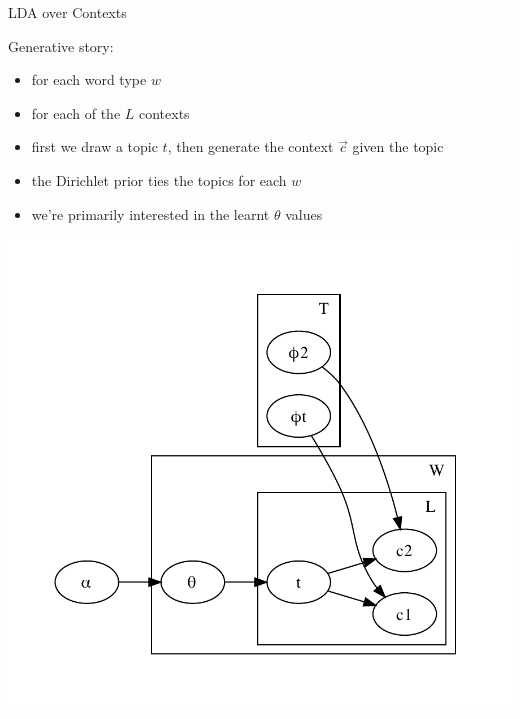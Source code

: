 \documentclass{beamer}
\begin{document}
\begin{frame}[t]{LDA over Contexts}

Generative story:
\begin{itemize}
    \item for each word type $w$
    \item for each of the $L$ contexts
    \item first we draw a topic $t$, then generate the context $\vec{c}$ given the topic
    \item the Dirichlet prior ties the topics for each $w$
    \item we're primarily interested in the learnt $\theta$ values
\end{itemize}

\includegraphics[scale=0.4]{context_lda.pdf}

\end{frame}
\end{document}
